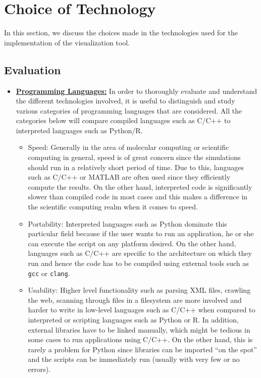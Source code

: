 \section*{Choice of Technology}
In this section, we discuss the choices made in the technologies used for the implementation of the visualization tool. 
\subsection*{Evaluation}

\begin{itemize}
    \item \textbf{\underline{Programming Languages:}} In order to thoroughly evaluate and understand the different technologies involved, it is useful to distinguish and study various categories of programming languages that are considered. All the categories below will compare compiled languages such as C/C++ to interpreted languages such as Python/R. 
    
    \begin{itemize}
        \item Speed: Generally in the area of molecular computing or scientific computing in general, speed is of great concern since the simulations should run in a relatively short period of time. Due to this, languages such as C/C++ or MATLAB are often used since they efficiently compute the results. On the other hand, interpreted code is significantly slower than compiled code in most cases and this makes a difference in the scientific computing realm when it comes to speed.
        
        \item Portability: Interpreted languages such as Python dominate this particular field because if the user wants to run an application, he or she can execute the script on any platform desired. On the other hand, languages such as C/C++ are specific to the architecture on which they run and hence the code has to be compiled using external tools such as \verb|gcc| or \verb|clang|. 
        
        \item Usability: Higher level functionality such as parsing XML files, crawling the web, scanning through files in a filesystem are more involved and harder to write in low-level languages such as C/C++ when compared to interpreted or scripting languages such as Python or R.  In addition, external libraries have to be linked manually, which might be tedious in some cases to run applications using C/C++. On the other hand, this is rarely a problem for Python since libraries can be imported ``on the spot'' and the scripts can be immediately run (usually with very few or no  errors).
        

\end{itemize}
\end{itemize}
